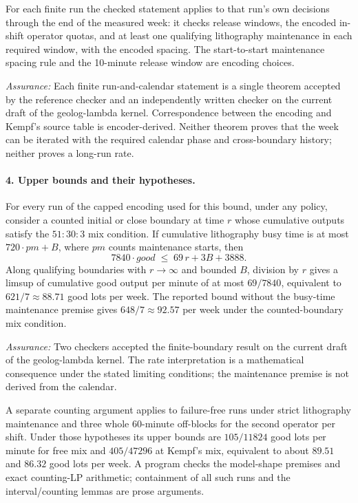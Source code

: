 For each finite run the checked statement applies to that run's own
decisions through the end of the measured week: it checks release
windows, the encoded in-shift operator quotas, and at least one
qualifying lithography maintenance in each required window, with the
encoded spacing. The start-to-start maintenance spacing rule and the
10-minute release window are encoding choices.

\emph{Assurance:} Each finite run-and-calendar statement is a single
theorem accepted by the reference checker and an independently written
checker on the current draft of the geolog-lambda kernel.
Correspondence between the encoding and Kempf's source table is
encoder-derived. Neither theorem proves that the week can be iterated
with the required calendar phase and cross-boundary history; neither
proves a long-run rate.

\paragraph{4. Upper bounds and their hypotheses.}
For every run of the capped encoding used for this bound, under any
policy, consider a counted initial or close boundary at time $r$ whose
cumulative outputs satisfy the $51{:}30{:}3$ mix condition. If
cumulative lithography busy time is at most $720\cdot\mathit{pm}+B$,
where $\mathit{pm}$ counts maintenance starts, then
\[
  7840 \cdot \mathit{good} \;\le\; 69\,r + 3B + 3888 .
\]
Along qualifying boundaries with $r\to\infty$ and bounded $B$, division
by $r$ gives a limsup of cumulative good output per minute of at most
$69/7840$, equivalent to $621/7\approx 88.71$ good lots per week. The
reported bound without the busy-time maintenance premise gives
$648/7\approx 92.57$ per week under the counted-boundary mix condition.

\emph{Assurance:} Two checkers accepted the finite-boundary result on
the current draft of the geolog-lambda kernel. The rate interpretation
is a mathematical consequence under the stated limiting conditions;
the maintenance premise is not derived from the calendar.

A separate counting argument applies to failure-free runs under strict
lithography maintenance and three whole 60-minute off-blocks for the
second operator per shift. Under those hypotheses its upper bounds are
$105/11824$ good lots per minute for free mix and $405/47296$ at
Kempf's mix, equivalent to about $89.51$ and $86.32$ good lots per
week. A program checks the model-shape premises and exact counting-LP
arithmetic; containment of all such runs and the interval/counting
lemmas are prose arguments.

